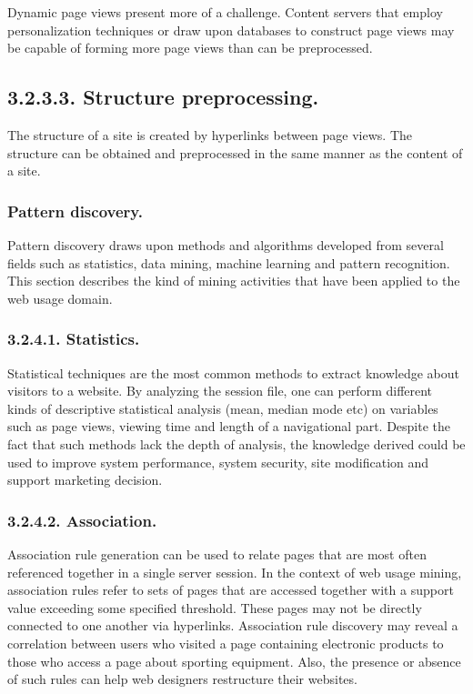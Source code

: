 \documentclass{article}
\begin{document}
Dynamic page views present more of a challenge. Content servers that employ personalization techniques or draw upon databases to construct page views may be capable of forming more page views than can be preprocessed.
\subsection*{\small{3.2.3.3. Structure preprocessing.}}
The structure of a site is created by hyperlinks between page views. The structure can be obtained and preprocessed in the same manner as the content of a site. 
\subsubsection{  Pattern discovery.}
Pattern discovery draws upon methods and algorithms developed from several fields such as statistics, data mining, machine learning and pattern recognition. This section describes the kind of mining activities that have been applied to the web usage domain.
\subsubsection*{3.2.4.1. Statistics.}
Statistical techniques are the most common methods to extract knowledge about visitors to a website. By analyzing the session file, one can perform different kinds of descriptive statistical analysis (mean, median mode etc) on variables such as page views, viewing time and length of a navigational part. Despite the fact that such methods lack the depth of analysis, the knowledge derived could be used to improve system performance, system security, site modification and support marketing decision.
\subsubsection*{3.2.4.2. Association.} 
Association rule generation can be used to relate pages that are most often referenced together in a single server session. In the context of web usage mining, association rules refer to sets of pages that are accessed together with a support value exceeding some specified threshold. These pages may not be directly connected to one another via hyperlinks. Association rule discovery may reveal a correlation between users who visited a page containing electronic products to those who access a page about sporting equipment. Also, the presence or absence of such rules can help web designers restructure their websites.
\end{document}
